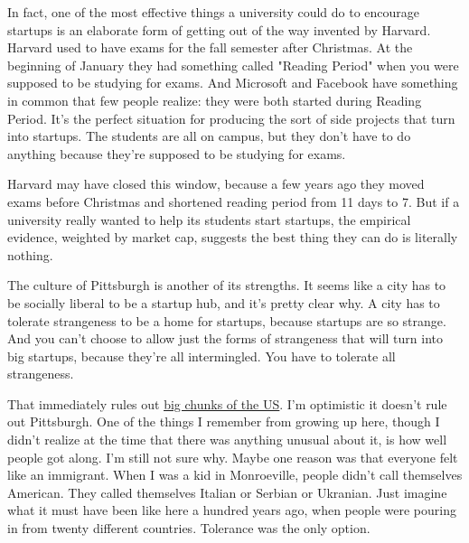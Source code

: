 In fact,
                  one of the most effective things a university could do to
                  encourage startups is an elaborate form of getting out of the
                  way invented by Harvard. Harvard used to have exams for the
                  fall semester after Christmas. At the beginning of January
                  they had something called "Reading Period" when you were
                  supposed to be studying for exams. And Microsoft and Facebook
                  have something in common that few people realize: they were
                  both started during Reading Period. It's the perfect situation
                  for producing the sort of side projects that turn into
                  startups. The students are all on campus, but they don't have
                  to do anything because they're supposed to be studying for
                  exams.

Harvard may have closed this window, because
                  a few years ago they moved exams before Christmas and
                  shortened reading period from 11 days to 7. But if a
                  university really wanted to help its students start startups,
                  the empirical evidence, weighted by market cap, suggests the
                  best thing they can do is literally nothing.

The
                  culture of Pittsburgh is another of its strengths. It seems
                  like a city has to be socially liberal to be a startup hub,
                  and it's pretty clear why. A city has to tolerate strangeness
                  to be a home for startups, because startups are so strange.
                  And you can't choose to allow just the forms of strangeness
                  that will turn into big startups, because they're all
                  intermingled. You have to tolerate all strangeness.

That
                  immediately rules out
                  \href{http://www.nytimes.com/2016/04/06/us/gay-rights-mississippi-north-carolina.html}{\underline{big chunks of the US}}. I'm optimistic it doesn't rule out Pittsburgh. One of the
                  things I remember from growing up here, though I didn't
                  realize at the time that there was anything unusual about it,
                  is how well people got along. I'm still not sure why. Maybe
                  one reason was that everyone felt like an immigrant. When I
                  was a kid in Monroeville, people didn't call themselves
                  American. They called themselves Italian or Serbian or
                  Ukranian. Just imagine what it must have been like here a
                  hundred years ago, when people were pouring in from twenty
                  different countries. Tolerance was the only option.

